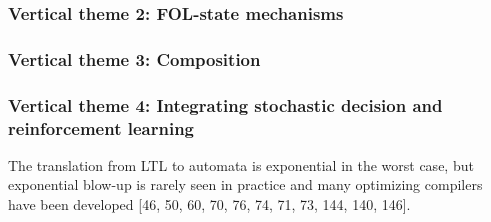 \subsubsection{Vertical theme 2: FOL-state mechanisms}
\subsubsection{Vertical theme 3: Composition}
\subsubsection{Vertical theme 4: Integrating stochastic decision and reinforcement learning} 

The translation from LTL to automata is exponential in the worst case, but exponential blow-up is rarely seen in practice and many optimizing compilers have been developed [46, 50, 60, 70, 76, 74, 71, 73, 144, 140, 146].











